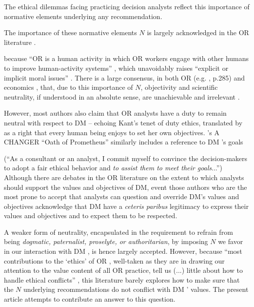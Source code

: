 \documentclass[preprint, french, english, 11pt, authoryear]{elsarticle}%
\newcommand{\possessivecite}[1]{\citeauthor{#1}’s \citeyearpar{#1}}
\begin{document}
\begin{changebar}
The ethical dilemmas facing practicing decision analysts \citep{taket_undercover_1994} reflect this importance of normative elements underlying any recommendation.
\end{changebar}
The importance of these normative elements $N$ is largely acknowledged in the OR %
literature \citep{churchman_operations_1970, brans_ethics_2007,picavet_opportunities_2009}.

because ``OR%
 is a human activity in which OR%
  workers engage with other humans to improve human-activity systems'' \citep{ormerod_operational_2013}, which unavoidably raises ``explicit or implicit moral issues'' \citep{diekmann_moral_2013}. 
There is a large consensus, in both OR%
 (e.g. \citet{williams_2009}, p.285) and economics \citep{dwyer_scientific_1985, heath_value_1994, sen_rationality_2004, mongin_value_2006, baujard_value_2013},
that, due to this importance of $N$, objectivity and scientific neutrality, if understood in an absolute sense, are unachievable and irrelevant \citep{le_menestrel_ethics_2004,reisach_creation_2016}. 

However, most authors also claim that OR%
 analysts have a duty to remain neutral with respect to DM%
-- echoing Kant’s tenet of duty ethics, translated by \citet{reisach_creation_2016} as a right that every human being enjoys to set her own objectives.
\possessivecite{gass_ethical_2009} A CHANGER ``Oath of Prometheus'' similarly includes a reference to DM%
’s goals 
\begin{changebar}
(``As a consultant or an analyst, I commit myself to convince the decision-makers to adopt a fair ethical behavior and \emph{to assist them to meet their goals}...'')
Although there are debates in the OR literature on the extent to which analysts should support the values and objectives of DM, event those authors who are the most prone to accept that analysts can question and override DM's values and objectives acknowledge that DM have a \emph{ceteris paribus} legitimacy to express their values and objectives and to expect them to be respected.
\end{changebar}
A weaker form of neutrality, encapsulated in the requirement to refrain from being \emph{dogmatic, paternalist, proselyte, or authoritarian}, by imposing $N$ we favor in our interaction with DM%
, is hence largely accepted.
However, because ``most contributions to the ‘ethics’ of OR%
, well-taken as they are in drawing our attention to the value content of all OR%
 practice, tell us (...) little about how to handle ethical conflicts'' \citep{ormerod_operational_2013},
this literature barely explores how to make sure that the $N$ underlying recommendations do not conflict with DM%
' values.
The present article attempts to contribute  an answer to this question.
\end{document}
